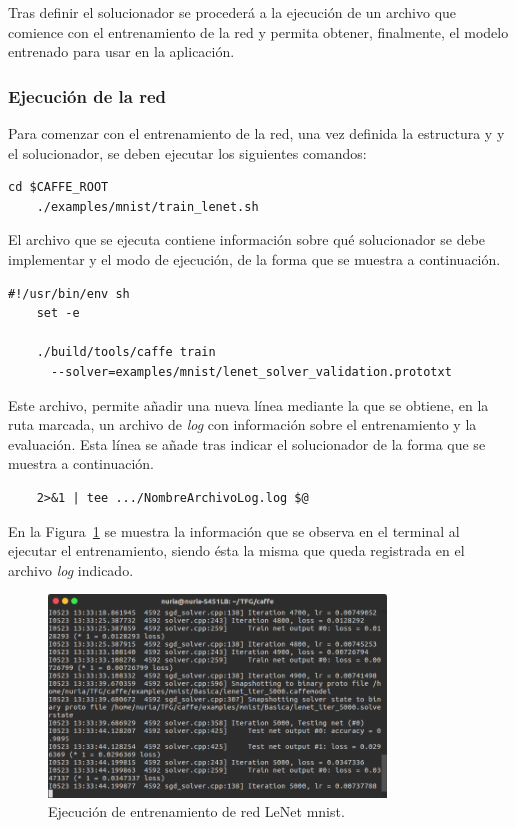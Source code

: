 	Tras definir el solucionador se procederá a la ejecución de un archivo que comience con el entrenamiento de la red y permita obtener, finalmente, el modelo entrenado para usar en la aplicación.
	
\subsubsection{Ejecución de la red}
	Para comenzar con el entrenamiento de la red, una vez definida la estructura y y el solucionador, se deben ejecutar los siguientes comandos:
	\vspace{10pt}
	\begin{lstlisting}[frame=single]
	cd $CAFFE_ROOT
	./examples/mnist/train_lenet.sh	
	\end{lstlisting}
	
	El archivo que se ejecuta contiene información sobre qué solucionador se debe implementar y el modo de ejecución, de la forma que se muestra a continuación.
	\vspace{10pt}
	\begin{lstlisting}[frame=single]
	#!/usr/bin/env sh
	set -e
	
	./build/tools/caffe train 
	  --solver=examples/mnist/lenet_solver_validation.prototxt 
	\end{lstlisting}
	Este archivo, permite añadir una nueva línea mediante la que se obtiene, en la ruta marcada, un archivo de \textit{log} con información sobre el entrenamiento y la evaluación. Esta línea se añade tras indicar el solucionador de la forma que se muestra a continuación.
	\vspace{10pt}
	\begin{lstlisting}
	2>&1 | tee .../NombreArchivoLog.log $@
	\end{lstlisting} 
	
	En la Figura~\ref{fig.entrenamiento} se muestra la información que se observa en el terminal al ejecutar el entrenamiento, siendo ésta la misma que queda registrada en el archivo \textit{log} indicado.
	
	\begin{figure}[H]
		\begin{center}
			\includegraphics[width=0.8\textwidth]{figures/RedBasica5000}
			\caption{Ejecución de entrenamiento de red LeNet \acrshort{mnist}.}
			\label{fig.entrenamiento}
		\end{center}
	\end{figure}
	

